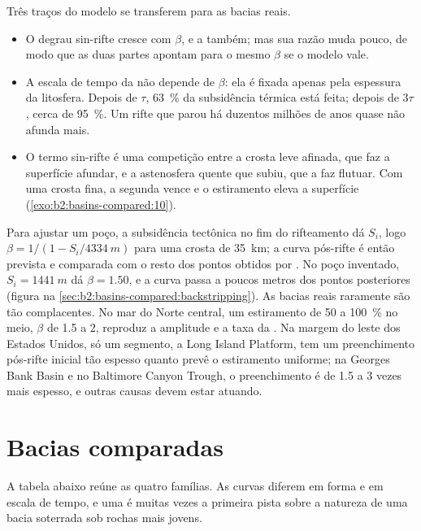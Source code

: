 Três traços do modelo se transferem para as bacias reais.
\begin{itemize}
  \item O degrau sin-rifte cresce com $\beta$, e a  também; mas sua
        razão muda pouco, de modo que as duas partes apontam para o mesmo $\beta$ se o modelo vale.
  \item A escala de tempo da  não depende de $\beta$: ela é fixada apenas pela
        espessura da litosfera. Depois de $\tau$, \qty{63}{\percent} da subsidência
        térmica está feita; depois de $3\tau$, cerca de \qty{95}{\percent}. Um rifte que parou há duzentos
        milhões de anos quase não afunda mais.
  \item O termo sin-rifte é uma competição entre a crosta leve afinada, que faz a
        superfície afundar, e a astenosfera quente que subiu, que a faz flutuar. Com uma crosta fina, a
        segunda vence e o estiramento eleva a superfície (\cref{exo:b2:basins-compared:10}).
\end{itemize}

Para ajustar um poço, a subsidência tectônica no fim do rifteamento dá $S_i$, logo
$\beta = 1/(1 - S_i/\qty{4334}{m})$ para uma crosta de \qty{35}{km}; a curva pós-rifte é então prevista
e comparada com o resto dos pontos obtidos por . No poço inventado, $S_i = \qty{1441}{m}$
dá $\beta = 1.50$, e a curva passa a poucos metros dos pontos posteriores (figura na
\cref{sec:b2:basins-compared:backstripping}). As bacias reais raramente são tão complacentes. No
mar do Norte central, um estiramento de 50 a \qty{100}{\percent} no meio, $\beta$ de 1.5 a 2,
reproduz a amplitude e a taxa da . Na margem do leste dos
Estados Unidos, só um segmento, a Long Island Platform, tem um preenchimento pós-rifte inicial tão espesso
quanto prevê o estiramento uniforme; na Georges Bank Basin e no Baltimore Canyon Trough, o
preenchimento é de 1.5 a 3 vezes mais espesso, e outras causas devem estar atuando.

\section{Bacias comparadas}\label{sec:b2:basins-compared:compared}

A tabela abaixo reúne as quatro famílias. As curvas diferem em forma e em escala de tempo, e uma
 é muitas vezes a primeira pista sobre a natureza de uma bacia soterrada sob rochas mais jovens.

